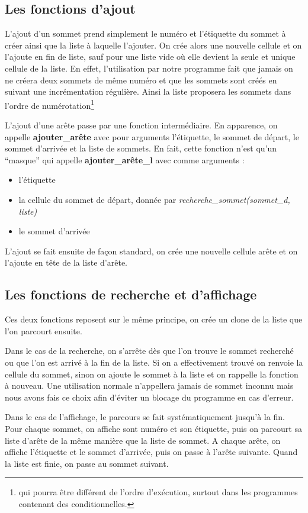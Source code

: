 \documentclass[a4paper,11pt]{article}
\begin{document}
	\subsection{Les fonctions d'ajout}
		L'ajout d'un sommet prend simplement le numéro et l'étiquette du sommet à créer ainsi que la liste à laquelle l'ajouter. On crée alors une nouvelle cellule et on l'ajoute en fin de liste, sauf pour une liste vide où elle devient la seule et unique cellule de la liste. En effet, l'utilisation par notre programme fait que jamais on ne créera deux sommets de même numéro et que les sommets sont créés en suivant une incrémentation régulière. Ainsi la liste proposera les sommets dans l'ordre de numérotation\footnote{qui pourra être différent de l'ordre d'exécution, surtout dans les programmes contenant des conditionnelles.}

		L'ajout d'une arête passe par une fonction intermédiaire. En apparence, on appelle \textbf{ajouter\_arête} avec pour arguments l'étiquette, le sommet de départ, le sommet d'arrivée et la liste de sommets. En fait, cette fonction n'est qu'un ``masque'' qui appelle \textbf{ajouter\_arête\_l} avec comme arguments : 
		\begin{itemize}
			\item l'étiquette
			\item la cellule du sommet de départ, donnée par \textit{recherche\_sommet(sommet\_d, liste)}
			\item le sommet d'arrivée
		\end{itemize}
		L'ajout se fait ensuite de façon standard, on crée une nouvelle cellule arête et on l'ajoute en tête de la liste d'arête.
	\subsection{Les fonctions de recherche et d'affichage}
		\label{parcourir}Ces deux fonctions reposent sur le même principe, on crée un clone de la liste que l'on parcourt ensuite.

 Dans le cas de la recherche, on s'arrête dès que l'on trouve le sommet recherché ou que l'on est arrivé à la fin de la liste. Si on a effectivement trouvé on renvoie la cellule du sommet, sinon on ajoute le sommet à la liste et on rappelle la fonction à nouveau. Une utilisation normale n'appellera jamais de sommet inconnu mais nous avons fais ce choix afin d'éviter un blocage du programme en cas d'erreur.

	Dans le cas de l'affichage, le parcours se fait systématiquement jusqu'à la fin. Pour chaque sommet, on affiche sont numéro et son étiquette, puis on parcourt sa liste d'arête de la même manière que la liste de sommet. A chaque arête, on affiche l'étiquette et le sommet d'arrivée, puis on passe à l'arête suivante. Quand la liste est finie, on passe au sommet suivant.
\end{document}
